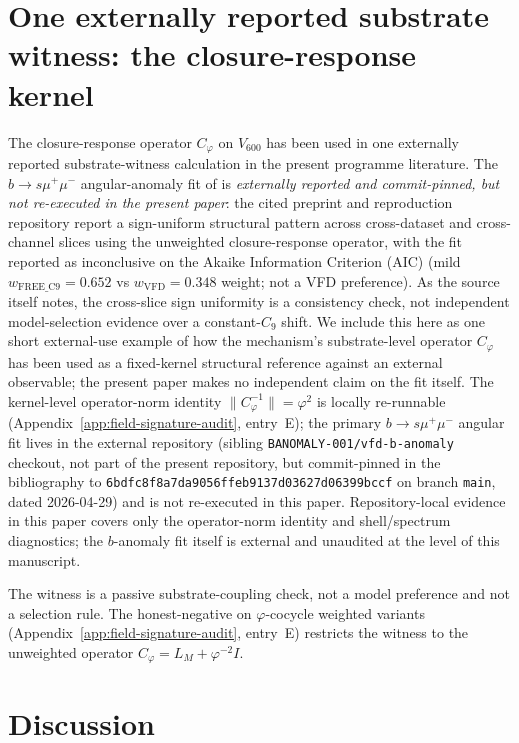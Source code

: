 \documentclass[11pt]{article}
\theoremstyle{definition}
\newcommand{\pphi}{\varphi}
\newcommand{\Vsub}{V_{600}}
\newcommand{\Cphi}{C_{\pphi}}
\begin{document}
\section{One externally reported substrate witness: the closure-response kernel}\label{sec:witness}

The closure-response operator $\Cphi$ on $\Vsub$ has been used in
one externally reported substrate-witness calculation in the present
programme literature. The
$b\to s\mu^+\mu^-$ angular-anomaly fit of \cite{SmartBAnomaly} is
\emph{externally reported and commit-pinned, but not re-executed in
the present paper}: the cited preprint and reproduction repository
report a sign-uniform structural pattern across cross-dataset and
cross-channel slices using the unweighted closure-response operator,
with the fit reported as inconclusive on the Akaike Information
Criterion (AIC) (mild
$w_{\mathrm{FREE\_C9}} = 0.652$ vs $w_{\mathrm{VFD}} = 0.348$ weight;
not a VFD preference). As the source itself notes, the cross-slice
sign uniformity is a consistency check, not independent
model-selection evidence over a constant-$C_9$ shift. We include
this here as one short external-use example of how the mechanism's
substrate-level operator $\Cphi$ has been used as a fixed-kernel
structural reference against an external observable; the present
paper makes no independent claim on the fit itself.
The kernel-level operator-norm identity
$\|\Cphi^{-1}\| = \pphi^2$ is locally re-runnable
(Appendix~\ref{app:field-signature-audit}, entry~E); the primary
$b\to s\mu^+\mu^-$ angular fit lives in the external
\cite{SmartBAnomaly} repository (sibling \texttt{BANOMALY-001/vfd-b-anomaly}
checkout, not part of the present repository, but commit-pinned in
the bibliography to \texttt{6bdfc8f8a7da9056ffeb9137d03627d06399bccf}
on branch \texttt{main}, dated 2026-04-29) and is not re-executed in this paper.
Repository-local evidence in this paper covers only the operator-norm
identity and shell/spectrum diagnostics; the $b$-anomaly fit itself
is external and unaudited at the level of this manuscript.

The witness is a passive substrate-coupling check, not a model
preference and not a selection rule. The honest-negative on
$\pphi$-cocycle weighted variants
(Appendix~\ref{app:field-signature-audit}, entry~E) restricts the witness to
the unweighted operator $\Cphi = L_M + \pphi^{-2} I$.

\section{Discussion}\label{sec:discussion}
\end{document}
